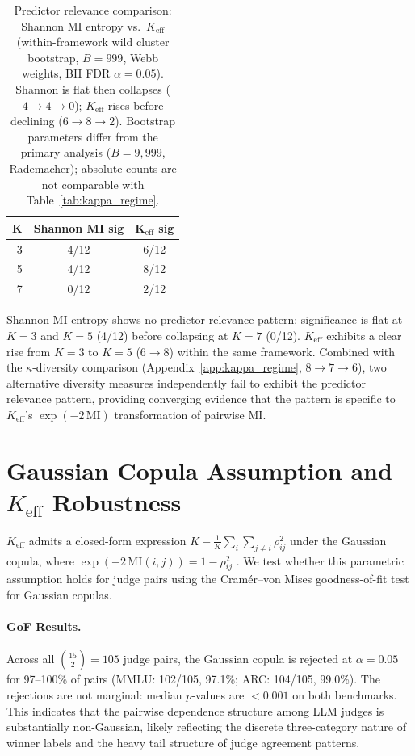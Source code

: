 \begin{table}[h]
\centering
\small
\caption{Predictor relevance comparison: Shannon MI entropy vs.\ $K_{\mathrm{eff}}$ (within-framework wild cluster bootstrap, $B{=}999$, Webb weights, BH FDR $\alpha{=}0.05$). Shannon is flat then collapses ($4 \to 4 \to 0$); $K_{\mathrm{eff}}$ rises before declining ($6 \to 8 \to 2$). Bootstrap parameters differ from the primary analysis ($B{=}9{,}999$, Rademacher); absolute counts are not comparable with Table~\ref{tab:kappa_regime}.}
\label{tab:shannon_shift}
\begin{tabular}{rcc}
\toprule
$\boldsymbol{K}$ & \textbf{Shannon MI sig} & $\boldsymbol{K_{\mathrm{eff}}}$ \textbf{sig} \\
\midrule
3 & 4/12 & 6/12 \\
5 & 4/12 & 8/12 \\
7 & 0/12 & 2/12 \\
\bottomrule
\end{tabular}
\end{table}

Shannon MI entropy shows no predictor relevance pattern: significance is flat at $K{=}3$ and $K{=}5$ (4/12) before collapsing at $K{=}7$ (0/12). $K_{\mathrm{eff}}$ exhibits a clear rise from $K{=}3$ to $K{=}5$ ($6 \to 8$) within the same framework. Combined with the $\kappa$-diversity comparison (Appendix~\ref{app:kappa_regime}, $8 \to 7 \to 6$), two alternative diversity measures independently fail to exhibit the predictor relevance pattern, providing converging evidence that the pattern is specific to $K_{\mathrm{eff}}$'s $\exp(-2\,\mathrm{MI})$ transformation of pairwise MI.

\FloatBarrier
\section{Gaussian Copula Assumption and $K_{\mathrm{eff}}$ Robustness}
\label{app:copula_gof}

$K_{\mathrm{eff}}$ admits a closed-form expression $K - \frac{1}{K}\sum_{i}\sum_{j \neq i} \rho_{ij}^2$ under the Gaussian copula, where $\exp(-2\,\mathrm{MI}(i,j)) = 1 - \rho_{ij}^2$ \citep{nelsen2006copulas}. We test whether this parametric assumption holds for judge pairs using the \citet{genest2008validity} Cram\'{e}r--von Mises goodness-of-fit test for Gaussian copulas.

\paragraph{GoF Results.} Across all $\binom{15}{2} = 105$ judge pairs, the Gaussian copula is rejected at $\alpha{=}0.05$ for 97--100\% of pairs (MMLU: 102/105, 97.1\%; ARC: 104/105, 99.0\%). The rejections are not marginal: median $p$-values are ${<}0.001$ on both benchmarks. This indicates that the pairwise dependence structure among LLM judges is substantially non-Gaussian, likely reflecting the discrete three-category nature of winner labels and the heavy tail structure of judge agreement patterns.

